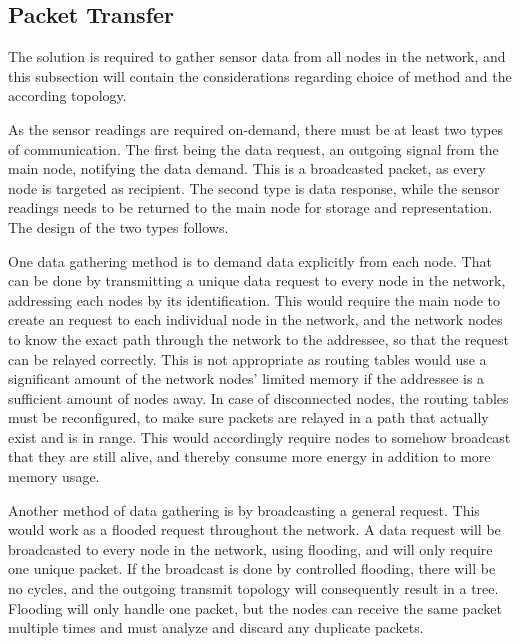 \subsection{Packet Transfer}
The solution is required to gather sensor data from all nodes in the network, and this subsection will contain the considerations regarding choice of method and the according topology.


As the sensor readings are required on-demand, there must be at least two types of communication. The first being the data request, an outgoing signal from the main node, notifying the data demand. This is a broadcasted packet, as every node is targeted as recipient. The second type is data response, while the sensor readings needs to be returned to the main node for storage and representation. The design of the two types follows.

One data gathering method is to demand data explicitly from each node. That can be done by transmitting a unique data request to every node in the network, addressing each nodes by its identification. This would require the main node to create an request to each individual node in the network, and the network nodes to know the exact path through the network to the addressee, so that the request can be relayed correctly. This is not appropriate as routing tables would use a significant amount of the network nodes' limited memory if the addressee is a sufficient amount of nodes away. In case of disconnected nodes, the routing tables must be reconfigured, to make sure packets are relayed in a path that actually exist and is in range. This would accordingly require nodes to somehow broadcast that they are still alive, and thereby consume more energy in addition to more memory usage.

Another method of data gathering is by broadcasting a general request. This would work as a flooded request throughout the network.
A data request will be broadcasted to every node in the network, using flooding, and will only require one unique packet. 
If the broadcast is done by controlled flooding, there will be no cycles, and the outgoing transmit topology will consequently result in a tree. 
Flooding will only handle one packet, but the nodes can receive the same packet multiple times and must analyze and discard any duplicate packets.

